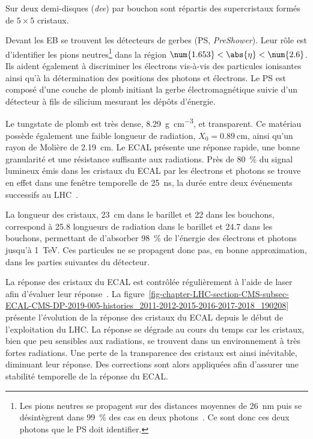Sur deux demi-disques (\emph{dee}) par bouchon sont répartis des \og supercristaux \fg{} formés de $5\times5$ cristaux.
\par Devant les EB se trouvent les détecteurs de gerbes (PS, \emph{PreShower}).
Leur rôle est d'identifier les pions neutres\footnote{Les pions neutres se propagent sur des distances moyennes de \SI{26}{\nano\meter} puis se désintègrent dans \SI{99}{\%} des cas en deux photons~\cite{PDG_booklet_2018}. Ce sont donc ces deux photons que le PS doit identifier.} dans la région $\num{1.653}<\abs{\eta}<\num{2.6}$.
Ils aident également à discriminer les électrons vis-à-vis des particules ionisantes ainsi qu'à la détermination des positions des photons et électrons.
Le PS est composé d'une couche de plomb initiant la gerbe électromagnétique suivie d'un détecteur à fils de silicium mesurant les dépôts d'énergie.
\par Le tungstate de plomb est très dense, \SI{8.29}{\gram.\centi\meter^{-3}}, et transparent.
Ce matériau possède également une faible longueur de radiation, $X_0=\SI{0.89}{\centi\meter}$, ainsi qu'un rayon de Molière de \SI{2.19}{\centi\meter}.
Le ECAL présente une réponse rapide, une bonne granularité et une résistance suffisante aux radiations.
Près de \SI{80}{\%} du signal lumineux émis dans les cristaux du ECAL par les électrons et photons se trouve en effet dans une fenêtre temporelle de \SI{25}{\nano\second}, la durée entre deux événements successifs au LHC~\cite{cms_paper}.
\par La longueur des cristaux, \SI{23}{\centi\meter} dans le barillet et \num{22} dans les bouchons, correspond à \num{25.8} longueurs de radiation dans le barillet et \num{24.7} dans les bouchons, permettant de d'absorber \SI{98}{\%} de l'énergie des électrons et photons jusqu'à \SI{1}{\TeV}.
Ces particules ne se propagent donc pas, en bonne approximation, dans les parties suivantes du détecteur.
\par La réponse des cristaux du ECAL est contrôlée régulièrement à l'aide de laser afin d'évaluer leur réponse~\cite{CMS-DP-2019-005}.
La figure~\ref{fig-chapter-LHC-section-CMS-subsec-ECAL-CMS-DP-2019-005-histories_2011-2012-2015-2016-2017-2018_190208} présente l'évolution de la réponse des cristaux du ECAL depuis le début de l'exploitation du LHC.
La réponse se dégrade au cours du temps car les cristaux, bien que peu sensibles aux radiations, se trouvent dans un environnement à très fortes radiations.
Une perte de la transparence des cristaux est ainsi inévitable, diminuant leur réponse.
Des corrections sont alors appliquées afin d'assurer une stabilité temporelle de la réponse du ECAL.
